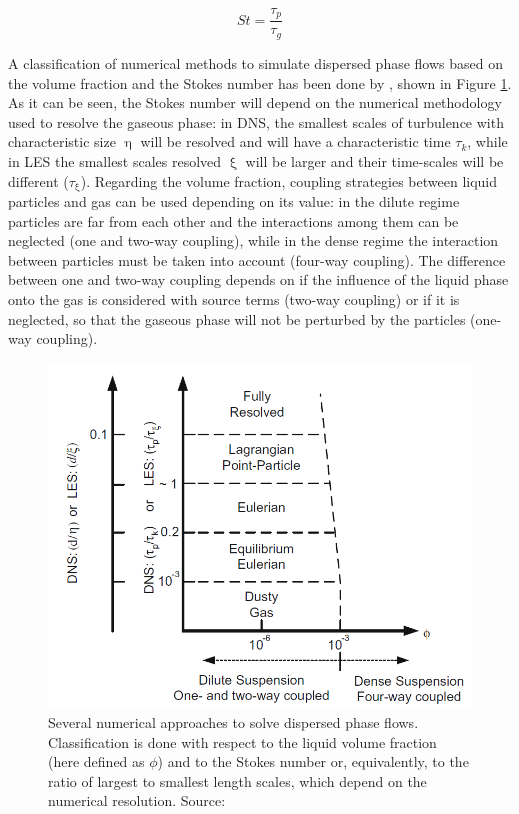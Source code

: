 \begin{equation}
\label{eq:Stokes_number_definition_general}
St = \frac{\tau_p}{\tau_g}
\end{equation}

A classification of numerical methods to simulate dispersed phase flows based on the volume fraction and the Stokes number has been done by , shown in Figure \ref{fig:balachandar_numerical_methods_representation}. As it can be seen, the Stokes number will depend on the numerical methodology used to resolve the gaseous phase: in DNS, the smallest scales of turbulence with characteristic size $\upeta$ will be resolved and will have a characteristic time $\tau_k$, while in LES the smallest scales resolved $\upxi$ will be larger and their time-scales will be different ($\tau_\upxi$). Regarding the volume fraction, coupling strategies between liquid particles and gas can be used depending on its value: in the dilute regime particles are far from each other and the interactions among them can be neglected (one and two-way coupling), while in the dense regime the interaction between particles must be taken into account (four-way coupling). The difference between one and two-way coupling depends on if the influence of the liquid phase onto the gas is considered with source terms (two-way coupling) or if it is neglected, so that the gaseous phase will not be perturbed by the particles (one-way coupling).


\begin{figure}[h!]
	\centering
	\includegraphics[scale=0.6]{./part1_numerical_approaches/figures_ch3/balachandar_disperse_phase_classification}
	\caption{Several numerical approaches to solve dispersed phase flows. Classification is done with respect to the liquid volume fraction (here defined as $\phi$) and to the Stokes number or, equivalently, to the ratio of largest to smallest length scales, which depend on the numerical resolution.  Source: }
	\label{fig:balachandar_numerical_methods_representation}
\end{figure}

